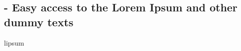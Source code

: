 
\subsection{ - Easy access to the Lorem Ipsum and other dummy texts}

\begin{demo}{}{lipsum}
	\lipsum[1]
\end{demo}

